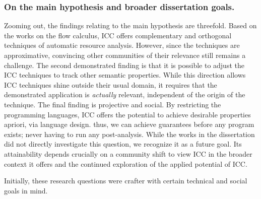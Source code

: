 \subsubsection*{On the main hypothesis and broader dissertation goals.}
Zooming out, the findings relating to the main hypothesis are threefold.
Based on the works on the flow calculus, ICC offers complementary and orthogonal techniques of automatic resource analysis.
However, since the techniques are approximative, convincing other communities of their relevance still remains a challenge.
The second demonstrated finding is that it is possible to adjust the ICC techniques to track other semantic properties.
While this direction allows ICC techniques shine outside their usual domain, it requires that the demonstrated application is \emph{actually} relevant, independent of the origin of the technique.
The final finding is projective and social.
By restricting the programming languages, ICC offers the potential to achieve desirable properties apriori, via language design.
thus, we can achieve guarantees before any program exists;
never having to run any post-analysis.
While the works in the dissertation did not directly investigate this question, we recognize it as a future goal.
Its attainability depends crucially on a community shift to view ICC in the broader context it offers and the continued exploration of the applied potential of ICC.

Initially, these research questions were crafter with certain technical and social goals in mind.
